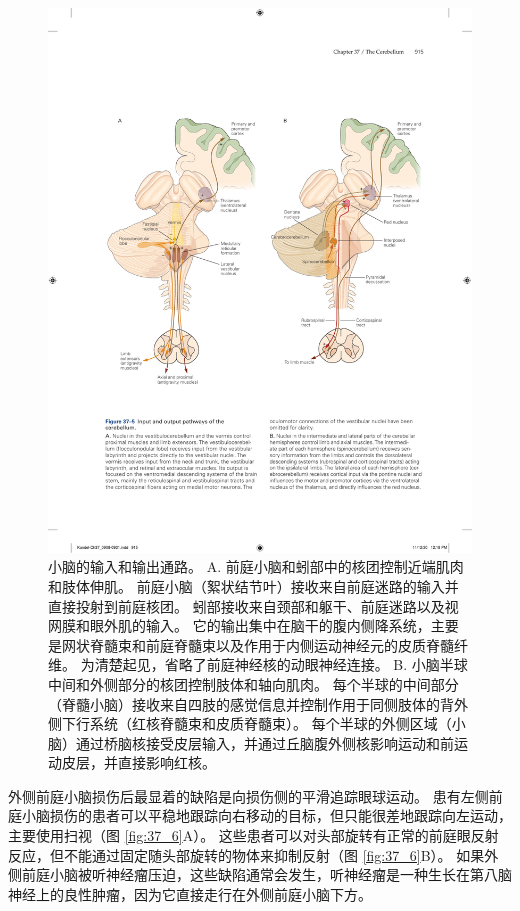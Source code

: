 \begin{figure}[htbp]
	\centering
	\includegraphics[width=0.9\linewidth]{chap37/fig_37_5}
	\caption{小脑的输入和输出通路。 A. 前庭小脑和蚓部中的核团控制近端肌肉和肢体伸肌。 前庭小脑（絮状结节叶）接收来自前庭迷路的输入并直接投射到前庭核团。 蚓部接收来自颈部和躯干、前庭迷路以及视网膜和眼外肌的输入。 它的输出集中在脑干的腹内侧降系统，主要是网状脊髓束和前庭脊髓束以及作用于内侧运动神经元的皮质脊髓纤维。 为清楚起见，省略了前庭神经核的动眼神经连接。 B. 小脑半球中间和外侧部分的核团控制肢体和轴向肌肉。 每个半球的中间部分（脊髓小脑）接收来自四肢的感觉信息并控制作用于同侧肢体的背外侧下行系统（红核脊髓束和皮质脊髓束）。 每个半球的外侧区域（小脑）通过桥脑核接受皮层输入，并通过丘脑腹外侧核影响运动和前运动皮层，并直接影响红核。}
	\label{fig:37_5}
\end{figure}

外侧前庭小脑损伤后最显着的缺陷是向损伤侧的平滑追踪眼球运动。 患有左侧前庭小脑损伤的患者可以平稳地跟踪向右移动的目标，但只能很差地跟踪向左运动，主要使用扫视（图 \ref{fig:37_6}A）。 
这些患者可以对头部旋转有正常的前庭眼反射反应，但不能通过固定随头部旋转的物体来抑制反射（图 \ref{fig:37_6}B）。 如果外侧前庭小脑被听神经瘤压迫，这些缺陷通常会发生，听神经瘤是一种生长在第八脑神经上的良性肿瘤，因为它直接走行在外侧前庭小脑下方。

